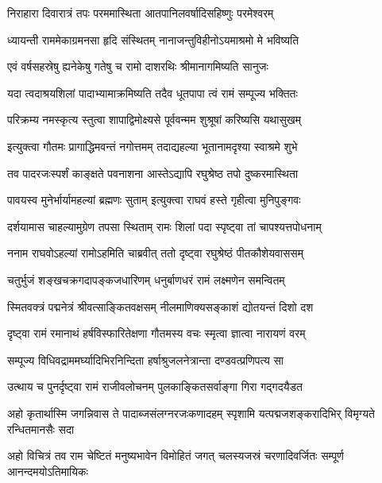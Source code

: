 \twolineshloka
{निराहारा दिवारात्रं तपः परममास्थिता}
{आतपानिलवर्षादिसहिष्णुः परमेश्वरम्} %

\twolineshloka
{ध्यायन्ती राममेकाग्रमनसा हृदि संस्थितम्}
{नानाजन्तुविहीनोऽयमाश्रमो मे भविष्यति} %

\twolineshloka
{एवं वर्षसहस्रेषु ह्यनेकेषु गतेषु च}
{रामो दाशरथिः श्रीमानागमिष्यति सानुजः} %

\twolineshloka
{यदा त्वदाश्रयशिलां पादाभ्यामाक्रमिष्यति}
{तदैव धूतपापा त्वं रामं सम्पूज्य भक्तितः} %

\twolineshloka
{परिक्रम्य नमस्कृत्य स्तुत्वा शापाद्विमोक्ष्यसे}
{पूर्ववन्मम शुश्रूषां करिष्यसि यथासुखम्} %

\twolineshloka
{इत्युक्त्वा गौतमः प्रागाद्धिमवन्तं नगोत्तमम्}
{तदाद्यहल्या भूतानामदृश्या स्वाश्रमे शुभे} %

\twolineshloka
{तव पादरजःस्पर्शं काङ्क्षते पवनाशना}
{आस्तेऽद्यापि रघुश्रेष्ठ तपो दुष्करमास्थिता} %

\twolineshloka
{पावयस्व मुनेर्भार्यामहल्यां ब्रह्मणः सुताम्}
{इत्युक्त्वा राघवं हस्ते गृहीत्वा मुनिपुङ्गवः} %

\twolineshloka
{दर्शयामास चाहल्यामुग्रेण तपसा स्थिताम्}
{रामः शिलां पदा स्पृष्ट्वा तां चापश्यत्तपोधनाम्} %

\twolineshloka
{ननाम राघवोऽहल्यां रामोऽहमिति चाब्रवीत्}
{ततो दृष्ट्वा रघुश्रेष्ठं पीतकौशेयवाससम्} %

\twolineshloka
{चतुर्भुजं शङ्खचक्रगदापङ्कजधारिणम्}
{धनुर्बाणधरं रामं लक्ष्मणेन समन्वितम्} %

\twolineshloka
{स्मितवक्त्रं पद्मनेत्रं श्रीवत्साङ्कितवक्षसम्}
{नीलमाणिक्यसङ्काशं द्योतयन्तं दिशो दश} %

\twolineshloka
{दृष्ट्वा रामं रमानाथं हर्षविस्फारितेक्षणा}
{गौतमस्य वचः स्मृत्वा ज्ञात्वा नारायणं वरम्} %

\twolineshloka
{सम्पूज्य विधिवद्राममर्घ्यादिभिरनिन्दिता}
{हर्षाश्रुजलनेत्रान्ता दण्डवत्प्रणिपत्य सा} %

\twolineshloka
{उत्थाय च पुनर्दृष्ट्वा रामं राजीवलोचनम्}
{पुलकाङ्कितसर्वाङ्गा गिरा गद्गदयैडत} %


\fourlineindentedshloka
{अहो कृतार्थास्मि जगन्निवास ते}
{पादाब्जसंलग्नरजःकणादहम्}
{स्पृशामि यत्पद्मजशङ्करादिभिर्\-}
{विमृग्यते रन्धितमानसैः सदा} %

\fourlineindentedshloka
{अहो विचित्रं तव राम चेष्टितं}
{मनुष्यभावेन विमोहितं जगत्}
{चलस्यजस्रं चरणादिवर्जितः}
{सम्पूर्ण आनन्दमयोऽतिमायिकः} %

